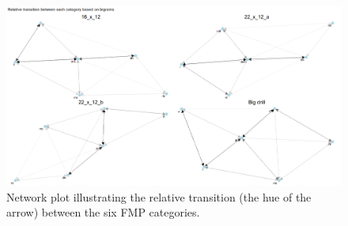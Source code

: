\documentclass[
]{article}
\begin{document}
\begin{figure}

{\centering \includegraphics[width=1\linewidth]{img/networkPlot} 

}

\caption{Network plot illustrating the relative transition (the hue of the arrow) between the six FMP categories.}\label{fig:network}
\end{figure}
\end{document}
